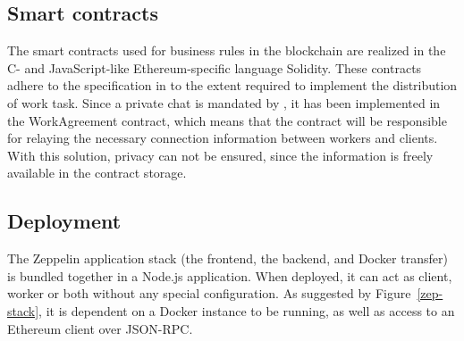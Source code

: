 \subsection{Smart contracts}
The smart contracts used for business rules in the blockchain are realized in the C- and JavaScript-like Ethereum-specific language Solidity. These contracts adhere to the specification in  to the extent required to implement the distribution of work task. Since a private chat is mandated by , it has been implemented in the WorkAgreement contract, which means that the contract will be responsible for relaying the necessary connection information between workers and clients. With this solution, privacy can not be ensured, since the information is freely available in the contract storage.


\subsection{Deployment}
The Zeppelin application stack (the frontend, the backend, and Docker transfer) is bundled together in a Node.js application. When deployed, it can act as client, worker or both without any special configuration. As suggested by Figure~\ref{zep-stack}, it is dependent on a Docker instance to be running, as well as access to an Ethereum client over JSON-RPC.
